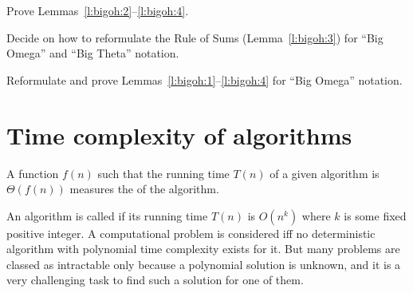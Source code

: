 \begin{Exercise}\label{exr:bigoh:features}
Prove Lemmas~\ref{l:bigoh:2}--\ref{l:bigoh:4}.
\end{Exercise}

\begin{Exercise}\label{exr:bigomega:sums}
Decide on how to reformulate the Rule of Sums (Lemma~\ref{l:bigoh:3})
for ``Big Omega'' and ``Big Theta'' notation.
\end{Exercise}

\begin{Exercise}\label{exr:bigomega:lem}
Reformulate and prove Lemmas~\ref{l:bigoh:1}--\ref{l:bigoh:4}
for ``Big Omega'' notation. 
\end{Exercise}

\section{Time complexity of algorithms} 
\label{time-compl}

\begin{Definition} [Informal]
A function $f(n)$ such that the running time $T(n)$ of a given 
algorithm is $\Theta(f(n))$ measures the  
of the algorithm.
\end{Definition}

An algorithm is called  if its running time $T(n)$
is $O(n^{k})$ where $k$ is some fixed positive integer. A computational
problem is considered  iff no deterministic
algorithm with polynomial time complexity exists for it. But many problems
are classed as intractable only because a polynomial solution is unknown,
and it is a very challenging task to find such a solution for one of them.
 
